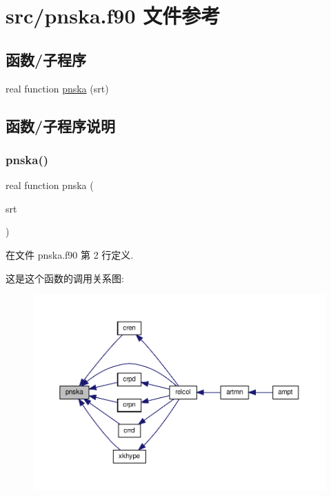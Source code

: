 \hypertarget{pnska_8f90}{}\section{src/pnska.f90 文件参考}
\label{pnska_8f90}
\subsection*{函数/子程序}
\begin{DoxyCompactItemize}
\item 
real function \mbox{\hyperlink{pnska_8f90_a1dcc7359ccbfee72ca69488389c3b977}{pnska}} (srt)
\end{DoxyCompactItemize}


\subsection{函数/子程序说明}
\mbox{\label{pnska_8f90_a1dcc7359ccbfee72ca69488389c3b977}} 
\subsubsection{\texorpdfstring{pnska()}{pnska()}}
{\footnotesize\ttfamily real function pnska (\begin{DoxyParamCaption}\item[{}]{srt }\end{DoxyParamCaption})}



在文件 pnska.\+f90 第 2 行定义.

这是这个函数的调用关系图\+:
\nopagebreak
\begin{figure}[H]
\begin{center}
\leavevmode
\includegraphics[width=350pt]{pnska_8f90_a1dcc7359ccbfee72ca69488389c3b977_icgraph}
\end{center}
\end{figure}
